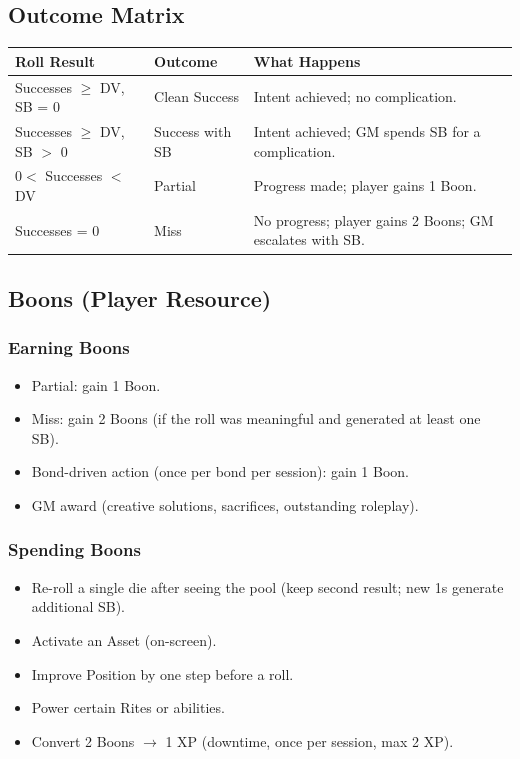 \subsection{Outcome Matrix}

\begin{tabular}{@{}lp{2.2cm}p{7cm}@{}}
\toprule
\textbf{Roll Result} & \textbf{Outcome} & \textbf{What Happens} \\
\midrule
Successes $\ge$ DV, SB = 0 & Clean Success & Intent achieved; no complication. \\
Successes $\ge$ DV, SB $>$ 0 & Success with SB & Intent achieved; GM spends SB for a complication. \\
$0 <$ Successes $<$ DV & Partial & Progress made; player gains 1 Boon. \\
Successes = 0 & Miss & No progress; player gains 2 Boons; GM escalates with SB. \\
\bottomrule
\end{tabular}

\subsection{Boons (Player Resource)}

\subsubsection{Earning Boons}
\begin{itemize}
  \item Partial: gain 1 Boon.
  \item Miss: gain 2 Boons (if the roll was meaningful and generated at least one SB).
  \item Bond-driven action (once per bond per session): gain 1 Boon.
  \item GM award (creative solutions, sacrifices, outstanding roleplay).
\end{itemize}

\subsubsection{Spending Boons}
\begin{itemize}
  \item Re-roll a single die after seeing the pool (keep second result; new 1s generate additional SB).
  \item Activate an Asset (on-screen).
  \item Improve Position by one step before a roll.
  \item Power certain Rites or abilities.
  \item Convert 2 Boons $\rightarrow$ 1 XP (downtime, once per session, max 2 XP).
\end{itemize}

